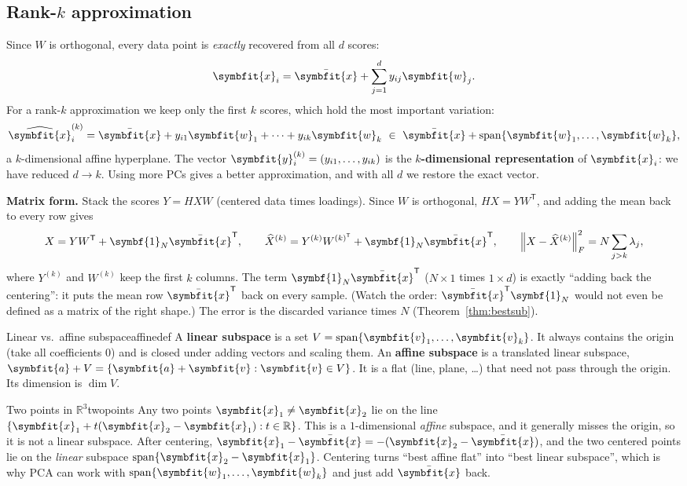 \documentclass[11pt]{article}
\newcommand{\bm}[1]{\symbfit{#1}}
\newcommand{\R}{\mathbb{R}}
\newcommand{\vx}{\bm{x}}
\newcommand{\vy}{\bm{y}}
\newcommand{\vw}{\bm{w}}
\newcommand{\one}{\symbf{1}}
\newcommand{\xbar}{\bar{\bm{x}}}
\newcommand{\T}{^{\mathsf T}}
\newcommand{\spn}{\operatorname{span}}
\newcommand{\Fro}[1]{\left\lVert #1\right\rVert_F}
\begin{document}
\subsection{Rank-$k$ approximation}

Since $W$ is orthogonal, every data point is \emph{exactly} recovered from all $d$ scores:
\[
\vx_i=\xbar+\sum_{j=1}^{d}y_{ij}\vw_j .
\]
For a rank-$k$ approximation we keep only the first $k$ scores, which hold the most
important variation:
\[
\widehat{\vx}_i^{(k)}=\xbar+y_{i1}\vw_1+\cdots+y_{ik}\vw_k\ \in\ \xbar+\spn\{\vw_1,\dots,\vw_k\},
\]
a $k$-dimensional affine hyperplane. The vector
$\vy_i^{(k)}=(y_{i1},\dots,y_{ik})$ is the \textbf{$k$-dimensional representation} of
$\vx_i$: we have reduced $d\to k$. Using more PCs gives a better approximation, and
with all $d$ we restore the exact vector.

\textbf{Matrix form.} Stack the scores $Y=HXW$ (centered data times loadings). Since $W$ is orthogonal, $HX=YW\T$, and
adding the mean back to every row gives
\[
X=YW\T+\one_N\xbar\T,\qquad
\widehat X^{(k)}=Y^{(k)}W^{(k)\T}+\one_N\xbar\T,\qquad
\Fro{X-\widehat X^{(k)}}^2=N\sum_{j>k}\lambda_j ,
\]
where $Y^{(k)}$ and $W^{(k)}$ keep the first $k$ columns. The term $\one_N\xbar\T$ ($N\times1$ times $1\times d$) is exactly ``adding
back the centering'': it puts the mean row $\xbar\T$ back on every sample. (Watch the order: $\xbar\T\one_N$ would not
even be defined as a matrix of the right shape.) The error is the discarded variance times $N$ (Theorem~\ref{thm:bestsub}).

\begin{definition}{Linear vs.\ affine subspace}{affinedef}
A \textbf{linear subspace} is a set $V=\spn\{\bm v_1,\dots,\bm v_k\}$. It always contains the
origin (take all coefficients $0$) and is closed under adding vectors and scaling them. An
\textbf{affine subspace} is a translated linear subspace, $\bm a+V=\{\bm a+\bm v:\bm v\in V\}$.
It is a flat (line, plane, \dots) that need not pass through the origin. Its dimension is $\dim V$.
\end{definition}

\begin{example}{Two points in $\R^3$}{twopoints}
Any two points $\vx_1\ne\vx_2$ lie on the line $\{\vx_1+t(\vx_2-\vx_1):t\in\R\}$. This is a
$1$-dimensional \emph{affine} subspace, and it generally misses the origin, so it is not a linear
subspace. After centering, $\vx_1-\xbar=-(\vx_2-\xbar)$, and the two centered points lie on the
\emph{linear} subspace $\spn\{\vx_2-\vx_1\}$. Centering turns ``best affine flat'' into ``best linear
subspace'', which is why PCA can work with $\spn\{\vw_1,\dots,\vw_k\}$ and just add $\xbar$ back.
\end{example}
\end{document}
